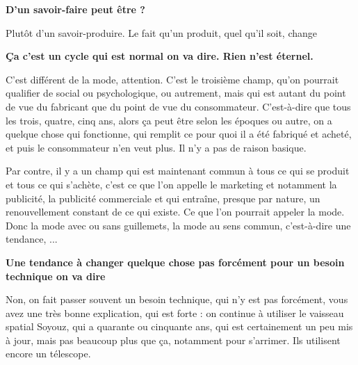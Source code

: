 \begin{small}
\vspace{1\baselineskip}

\textbf{D'un savoir-faire peut être ?}

\vspace{1\baselineskip}

Plutôt d'un savoir-produire. Le fait qu'un produit, quel qu'il soit, change

\vspace{1\baselineskip}

\textbf{Ça c'est un cycle qui est normal on va dire. Rien n'est éternel.}

\vspace{1\baselineskip}

C'est différent de la mode, attention. C'est le troisième champ, qu'on pourrait qualifier de social ou psychologique, ou autrement, mais qui est autant du point de vue du fabricant que du point de vue du consommateur. C'est-à-dire que tous les trois, quatre, cinq ans, alors ça peut être selon les époques ou autre, on a quelque chose qui fonctionne, qui remplit ce pour quoi il a été fabriqué et acheté, et puis le consommateur n'en veut plus. Il n'y a pas de raison basique.

Par contre, il y a un champ qui est maintenant commun à tous ce qui se produit et tous ce qui s'achète, c'est ce que l'on appelle le marketing et notamment la publicité, la publicité commerciale et qui entraîne, presque par nature, un renouvellement constant de ce qui existe. Ce que l'on pourrait appeler la mode. Donc la mode avec ou sans guillemets, la mode au sens commun, c'est-à-dire une tendance, ...


\vspace{1\baselineskip}

\textbf{Une tendance à changer quelque chose pas forcément pour un besoin technique on va dire}


\vspace{1\baselineskip}

Non, on fait passer souvent un besoin technique, qui n'y est pas forcément, vous avez une très bonne explication, qui est forte : on continue à utiliser le vaisseau spatial Soyouz, qui a quarante ou cinquante ans, qui est certainement un peu mis à jour, mais pas beaucoup plus que ça, notamment pour s'arrimer. Ils utilisent encore un télescope.

\vspace{1\baselineskip}


\end{small}
